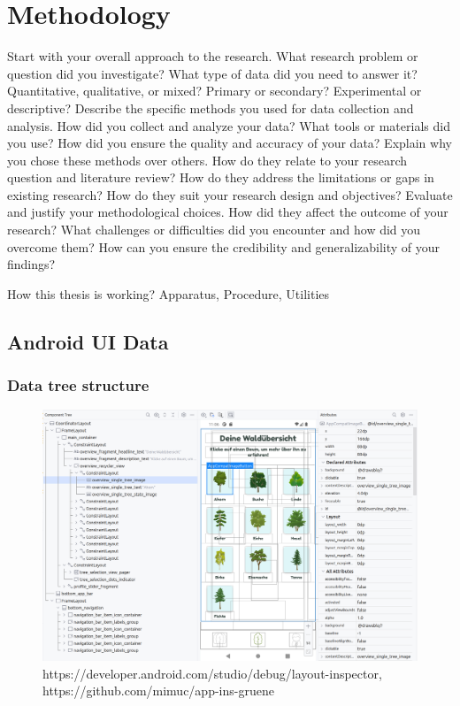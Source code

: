 \chapter{Methodology}

Start with your overall approach to the research. What research problem or question did you investigate? What type of data did you need to answer it? Quantitative, qualitative, or mixed? Primary or secondary? Experimental or descriptive?
Describe the specific methods you used for data collection and analysis. How did you collect and analyze your data? What tools or materials did you use? How did you ensure the quality and accuracy of your data?
Explain why you chose these methods over others. How do they relate to your research question and literature review? How do they address the limitations or gaps in existing research? How do they suit your research design and objectives?
Evaluate and justify your methodological choices. How did they affect the outcome of your research? What challenges or difficulties did you encounter and how did you overcome them? How can you ensure the credibility and generalizability of your findings?

How this thesis is working?
Apparatus, Procedure, Utilities


\section{Android UI Data}
\subsection{Data tree structure}

\begin{figure}
    \centering
    \includegraphics[width=\textwidth]{graphics/android_layout_inspector}
    \caption{https://developer.android.com/studio/debug/layout-inspector, https://github.com/mimuc/app-ins-gruene}
    \label{fig:android_layout_inspector}
\end{figure}

